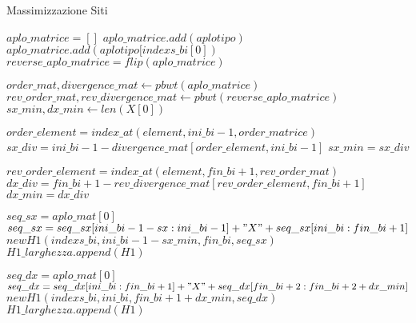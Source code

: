 \documentclass{article}
\begin{document}
\begin{algorithm}
\caption{Massimizzazione Siti}\label{alg:cap}
\begin{algorithmic}
        \State $aplo\_matrice = []$
                \State $aplo\_matrice.add(aplotipo)$
            \EndIf
        \EndFor
        \State $aplo\_matrice.add(aplotipo[indexs\_bi[0])$
        \State $reverse\_aplo\_matrice = flip(aplo\_matrice)$
        
        \State $order\_mat, divergence\_mat \gets pbwt(aplo\_matrice)$
        \State $rev\_order\_mat, rev\_divergence\_mat \gets pbwt(reverse\_aplo\_matrice)$
        \State $sx\_min, dx\_min \gets len(X[0])$
        
                \State $order\_element = index\_at(element, ini\_bi-1, order\_matrice)$
                \State $sx\_div = ini\_bi-1 - divergence\_mat[order\_element, ini\_bi-1]$
                    \State $sx\_min = sx\_div$
                \EndIf
                
                \State $rev\_order\_element = index\_at(element, fin\_bi+1, rev\_order\_mat)$
                \State $dx\_div = fin\_bi+1 - rev\_divergence\_mat[rev\_order\_element, fin\_bi+1]$
                    \State $dx\_min = dx\_div$
                \EndIf
            \EndIf
        \EndFor
        
        \State $seq\_sx = aplo\_mat[0]$
        \State $seq\_sx = seq\_sx[ini\_bi-1-sx: ini\_bi-1] + "X" + seq\_sx[ini\_bi: fin\_bi+1]$
        \State $new H1(indexs\_bi, ini\_bi-1-sx\_min, fin\_bi, seq\_sx)$
        \State $H1\_larghezza.append(H1)$
        
        \State $seq\_dx = aplo\_mat[0]$
        \State $seq\_dx = seq\_dx[ini\_bi: fin\_bi+1] + "X" + seq\_dx[fin\_bi+2: fin\_bi+2+dx\_min]$
        \State $new H1(indexs\_bi, ini\_bi, fin\_bi+1+dx\_min, seq\_dx)$
        \State $H1\_larghezza.append(H1)$
        
    \EndFor
    
\end{algorithmic}
\end{algorithm}
\end{document}

